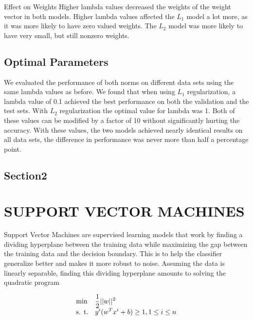 \documentclass[10pt,twoside]{article}
\begin{document}
Effect on Weights
Higher lambda values decreased the weights of the weight vector in both models. Higher lambda values affected the $L_1$ model a lot more, as it was more likely to have zero valued weights. The $L_2$ model was more likely to have very small, but still nonzero weights. 

\subsection{Optimal Parameters}
We evaluated the performance of both norms on different data sets using the same lambda values as before. We found that when using $L_1$ regularization, a lambda value of 0.1 achieved the best performance on both the validation and the test sets. With $L_2$ regularization the optimal value for lambda was 1. Both of these values can be modified by a factor of 10 without significantly hurting the accuracy. With these values, the two models achieved nearly identical results on all data sets, the difference in performance was never more than half a percentage point.

\subsection{Section2}




\section{\uppercase{Support Vector Machines}}

Support Vector Machines are supervised learning models that work by finding a dividing hyperplane between the training data while maximizing the gap between the training data and the decision boundary. This is to help the classifier generalize better and makes it more robust to noise. Assuming the data is linearly separable, finding this dividing hyperplane amounts to solving the quadratic program

\begin{equation}
\begin{array}{ll@{}ll}
\text{min}  & \displaystyle \frac{1}{2} ||w||^2 &\\
\text{s. t.}& \displaystyle y^i(w^T x^i + b) \geq 1 , 1 \leq i \leq n
\end{array}
\end{equation}
\end{document}
